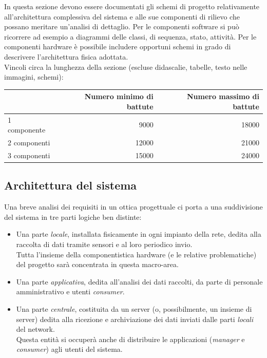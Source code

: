 \documentclass[12pt]{article}
\begin{document}
In questa sezione devono essere documentati gli schemi di progetto relativamente all'architettura complessiva del sistema e alle sue componenti di rilievo che possano meritare un'analisi di dettaglio. Per le componenti software si può ricorrere ad esempio a diagrammi delle classi, di sequenza, stato, attività. Per le componenti hardware è possibile includere opportuni schemi in grado di descrivere l'architettura fisica adottata.\\

Vincoli circa la lunghezza della sezione (escluse didascalie, tabelle, testo nelle immagini, schemi):

\vspace{1cm}
\begin{tabular}{l|rr}
 & Numero minimo di battute & Numero massimo di battute \\
 \hline
 1 componente & 9000 & 18000 \\
 2 componenti & 12000 & 21000 \\
 3 componenti & 15000 & 24000 \\
 \hline
\end{tabular}


\newpage
\subsection{Architettura del sistema}

Una breve analisi dei requisiti in un ottica progettuale ci porta a una suddivisione del sistema in tre parti logiche ben distinte: 
\begin{itemize}
	\item Una parte \textit{locale}, installata fisicamente in ogni impianto della rete, dedita alla raccolta di dati tramite sensori e al loro periodico invio.
	\\ Tutta l'insieme della componentistica hardware (e le relative problematiche) del progetto sarà concentrata in questa macro-area.
	\item Una parte \textit{applicativa}, dedita all'analisi dei dati raccolti, da parte di personale amministrativo e utenti \textit{consumer}.
	\item Una parte \textit{centrale}, costituita da un server (o, possibilmente, un insieme di server) dedita alla ricezione e archiviazione dei dati inviati dalle parti \textit{locali} del network.\\
	Questa entità si occuperà anche di distribuire le applicazioni (\textit{manager} e \textit{consumer}) agli utenti del sistema.
\end{itemize}
\end{document}

